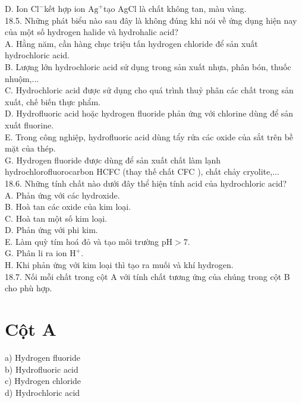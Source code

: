 \documentclass[10pt]{article}
\begin{document}
D. Ion $\mathrm{Cl}^{-}$kết hợp ion $\mathrm{Ag}^{+}$tạo AgCl là chất không tan, màu vàng.\\
18.5. Những phát biểu nào sau đây là không đúng khi nói về ứng dụng hiện nay của một số hydrogen halide và hydrohalic acid?\\
A. Hằng năm, cần hàng chục triệu tấn hydrogen chloride để sản xuất hydrochloric acid.\\
B. Lượng lớn hydrochloric acid sử dụng trong sản xuất nhựa, phân bón, thuốc nhuộm,...\\
C. Hydrochloric acid được sử dụng cho quá trình thuỷ phân các chất trong sản xuất, chế biến thực phẩm.\\
D. Hydrofluoric acid hoặc hydrogen fluoride phản ứng với chlorine dùng để sản xuất fluorine.\\
E. Trong công nghiệp, hydrofluoric acid dùng tẩy rửa các oxide của sắt trên bề mặt của thép.\\
G. Hydrogen fluoride được dùng để sản xuất chất làm lạnh hydrochlorofluorocarbon HCFC (thay thế chất CFC ), chất chảy cryolite,...\\
18.6. Những tính chất nào dưới đây thể hiện tính acid của hydrochloric acid?\\
A. Phản ứng với các hydroxide.\\
B. Hoà tan các oxide của kim loại.\\
C. Hoà tan một số kim loại.\\
D. Phản ứng với phi kim.\\
E. Làm quỳ tím hoá đỏ và tạo môi trường $\mathrm{pH}>7$.\\
G. Phân li ra ion $\mathrm{H}^{+}$.\\
H. Khi phản ứng với kim loại thì tạo ra muối và khí hydrogen.\\
18.7. Nối mỗi chất trong cột A với tính chất tương ứng của chúng trong cột B cho phù hợp.

\section*{Cột A}
a) Hydrogen fluoride\\
b) Hydrofluoric acid\\
c) Hydrogen chloride\\
d) Hydrochloric acid
\end{document}
